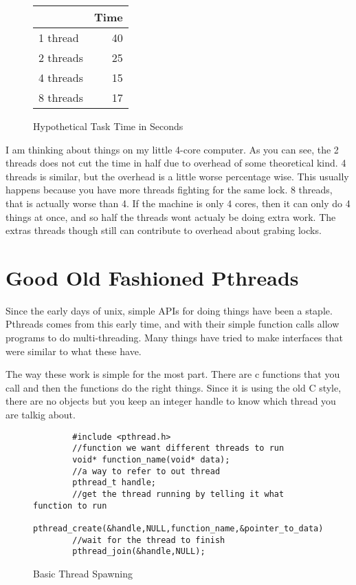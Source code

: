 \documentclass[12pt]{article}
\begin{document}
\begin{figure} [ht]
	\centering
	\begin{tabular}{|l|r|}
		\hline
		& Time  \\ \hline
		1 thread&40 \\ \hline
		2 threads&25 \\ \hline
		4 threads&15 \\ \hline
		8 threads&17 \\ \hline
	\end{tabular}
	\caption{Hypothetical Task Time in Seconds}
	\label{sorting_time2}
\end{figure}

I am thinking about things on my little 4-core computer.
As you can see, the 2 threads does not cut the time in half due to overhead of some theoretical kind.
4 threads is similar, but the overhead is a little worse percentage wise.
This usually happens because you have more threads fighting for the same lock.
8 threads, that is actually worse than 4.
If the machine is only 4 cores, then it can only do 4 things at once, and so half the threads wont actualy be doing extra work.
The extras threads though still can contribute to overhead about grabing locks.

\newpage
\section{Good Old Fashioned Pthreads}

Since the early days of unix, simple APIs for doing things have been a staple.
Pthreads comes from this early time, and with their simple function calls allow programs to do multi-threading.
Many things have tried to make interfaces that were similar to what these have.

The way these work is simple for the most part.
There are c functions that you call and then the functions do the right things.
Since it is using the old C style, there are no objects but you keep an integer handle to know which thread you are talkig about.

\begin{figure}[htb]
	\centering
	\begin{verbatim}
		#include <pthread.h>
		//function we want different threads to run
		void* function_name(void* data);
		//a way to refer to out thread
		pthread_t handle;
		//get the thread running by telling it what function to run
		pthread_create(&handle,NULL,function_name,&pointer_to_data);
		//wait for the thread to finish
		pthread_join(&handle,NULL);
	\end{verbatim}
	\caption{Basic Thread Spawning}
\end{figure}
\end{document}
